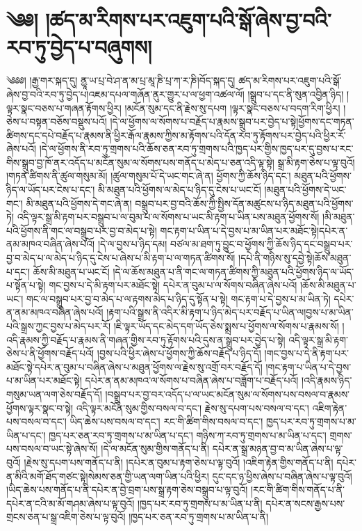 \chapter{༄༅། །ཚད་མ་རིགས་པར་འཇུག་པའི་སྒོ་ཞེས་བྱ་བའི་རབ་ཏུ་བྱེད་པ་བཞུགས།}༄༅༅། །རྒྱ་གར་སྐད་དུ། ནྱཱ་ཡ་པྲ་བེ་ཤ་ན་མ་པྲ་མཱ་ཎི་པྲ་ཀ་ར་ཎི།བོད་སྐད་དུ། ཚད་མ་རིགས་པར་འཇུག་པའི་སྒོ་ཞེས་བྱ་བའི་རབ་ཏུ་བྱེད་པ།འཇམ་དཔལ་གཞོན་ནུར་གྱུར་པ་ལ་ཕྱག་འཚལ་ལོ། །སྒྲུབ་པ་དང་ནི་སུན་འབྱིན་ཉིད། །ལྟར་སྣང་བཅས་པ་གཞན་རྟོགས་ཕྱིར། །མངོན་སུམ་དང་ནི་རྗེས་སུ་དཔག །ལྟར་སྣང་བཅས་པ་བདག་རིག་ཕྱིར། །ཅེས་པ་བསྟན་བཅོས་བསྡུས་པའོ། །དེ་ལ་ཕྱོགས་ལ་སོགས་པ་བརྗོད་པ་རྣམས་སྒྲུབ་པར་བྱེད་པ་སྟེ།ཕྱོགས་དང་གཏན་ཚིགས་དང་དཔེ་བརྗོད་པ་རྣམས་ནི་ཕྱིར་རྒོལ་རྣམས་ཀྱིས་མ་རྟོགས་པའི་དོན་རབ་ཏུ་རྟོགས་པར་བྱེད་པའི་ཕྱིར་རོ་ཞེས་པའོ། །དེ་ལ་ཕྱོགས་ནི་རབ་ཏུ་གྲགས་པའི་ཆོས་ཅན་རབ་ཏུ་གྲགས་པའི་ཁྱད་པར་གྱིས་ཁྱད་པར་དུ་བྱས་པ་རང་གིས་སྒྲུབ་བྱ་ཁོ་ནར་འདོད་པ་མངོན་སུམ་ལ་སོགས་པས་གནོད་པ་མེད་པ་ཅན་འདི་ལྟ་སྟེ། སྒྲ་མི་རྟག་ཅེས་པ་ལྟ་བུའོ། །གཏན་ཚིགས་ནི་ཚུལ་གསུམ་མོ། །ཚུལ་གསུམ་པོ་དེ་ཡང་གང་ཞེ་ན། ཕྱོགས་ཀྱི་ཆོས་ཉིད་དང་། མཐུན་པའི་ཕྱོགས་ཉིད་ལ་ཡོད་པར་ངེས་པ་དང་། མི་མཐུན་པའི་ཕྱོགས་ལ་མེད་པ་ཉིད་དུ་ངེས་པ་ཡང་ངོ། །མཐུན་པའི་ཕྱོགས་དེ་ཡང་གང་། མི་མཐུན་པའི་ཕྱོགས་དེ་གང་ཞེ་ན། བསྒྲུབ་པར་བྱ་བའི་ཆོས་ཀྱི་སྤྱིས་དོན་མཚུངས་པ་ཉིད་མཐུན་པའི་ཕྱོགས་ཏེ། འདི་ལྟར་སྒྲ་མི་རྟག་པར་བསྒྲུབ་པ་ལ་བུམ་པ་ལ་སོགས་པ་ཡང་མི་རྟག་པ་ཡིན་པས་མཐུན་ཕྱོགས་སོ། །མི་མཐུན་པའི་ཕྱོགས་ནི་གང་ལ་བསྒྲུབ་པར་བྱ་བ་མེད་པ་སྟེ། གང་རྟག་པ་ཡིན་པ་དེ་བྱས་པ་མ་ཡིན་པར་མཐོང་སྟེ།དཔེར་ན་ནམ་མཁའ་བཞིན་ཞེས་པའོ། །དེ་ལ་བྱས་པ་ཉིད་དམ། བཙལ་མ་ཐག་ཏུ་བྱུང་བ་ཕྱོགས་ཀྱི་ཆོས་ཉིད་དང་བསྒྲུབ་པར་བྱ་བ་མེད་པ་ལ་མེད་པ་ཉིད་དུ་ངེས་པ་ཞེས་པ་མི་རྟག་པ་ལ་གཏན་ཚིགས་སོ། །དཔེ་ནི་གཉིས་སུ་དབྱེ་སྟེ།ཆོས་མཐུན་པ་དང་། ཆོས་མི་མཐུན་པ་ཡང་ངོ། །དེ་ལ་ཆོས་མཐུན་པ་ནི་གང་ལ་གཏན་ཚིགས་ཀྱི་མཐུན་པའི་ཕྱོགས་ཉིད་ལ་ཡོད་པ་སྟོན་པ་སྟེ། གང་བྱས་པ་དེ་མི་རྟག་པར་མཐོང་སྟེ། དཔེར་ན་བུམ་པ་ལ་སོགས་བཞིན་ཞེས་པའོ། །ཆོས་མི་མཐུན་པ་ཡང་། གང་ལ་བསྒྲུབ་པར་བྱ་བ་མེད་པ་ལ་རྟགས་མེད་པ་ཉིད་དུ་སྟོན་པ་སྟེ། གང་རྟག་པ་དེ་བྱས་པ་མ་ཡིན་ཏེ། དཔེར་ན་ནམ་མཁའ་བཞིན་ཞེས་པའོ། །རྟག་པའི་སྒྲས་ནི་འདིར་མི་རྟག་པ་ཉིད་མེད་པར་བརྗོད་པ་ཡིན་ལ།བྱས་པ་མ་ཡིན་པའི་སྒྲས་ཀྱང་བྱས་པ་མེད་པར་རོ། །ཇི་ལྟར་ཡོད་དང་མེད་དག་ཡོད་ཅེས་སྨྲས་པ་ཕྱོགས་ལ་སོགས་པ་རྣམས་སོ། །འདི་རྣམས་ཀྱི་བརྗོད་པ་རྣམས་ནི་གཞན་གྱིས་རབ་ཏུ་རྟོགས་པའི་དུས་ན་སྒྲུབ་པར་བྱེད་པ་སྟེ། འདི་ལྟར་སྒྲ་མི་རྟག་ཅེས་པ་ནི་ཕྱོགས་བརྗོད་པའོ། །བྱས་པའི་ཕྱིར་ཞེས་པ་ཕྱོགས་ཀྱི་ཆོས་བརྗོད་པ་ཉིད་དོ། །གང་བྱས་པ་དེ་ནི་རྟག་པར་མཐོང་སྟེ་དཔེར་ན་བུམ་པ་བཞིན་ཞེས་པ་མཐུན་ཕྱོགས་ལ་རྗེས་སུ་འགྲོ་བར་བརྗོད་དོ། །གང་རྟག་པ་ཡིན་པ་དེ་བྱས་པ་མ་ཡིན་པར་མཐོང་སྟེ། དཔེར་ན་ནམ་མཁའ་ལ་སོགས་པ་བཞིན་ཞེས་པ་བཟློག་པ་བརྗོད་པའོ། །འདི་རྣམས་ཉིད་གསུམ་ཡན་ལག་ཅེས་བརྗོད་དོ། །བསྒྲུབ་པར་བྱ་བར་འདོད་པ་ལ་ཡང་མངོན་སུམ་ལ་སོགས་པས་བསལ་བ་རྣམས་ཕྱོགས་ལྟར་སྣང་བ་སྟེ། འདི་ལྟར་མངོན་སུམ་གྱིས་བསལ་བ་དང་། རྗེས་སུ་དཔག་པས་བསལ་བ་དང་། འཇིག་རྟེན་པས་བསལ་བ་དང་། ཡིད་ཆེས་པས་བསལ་བ་དང་། རང་གི་ཚིག་གིས་བསལ་བ་དང་། ཁྱད་པར་རབ་ཏུ་གྲགས་པ་མ་ཡིན་པ་དང་། ཁྱད་པར་ཅན་རབ་ཏུ་གྲགས་པ་མ་ཡིན་པ་དང་། གཉིས་ཀ་རབ་ཏུ་གྲགས་པ་མ་ཡིན་པ་དང་། གྲགས་པས་བསལ་བ་ཡང་སྟེ་ཞེས་སོ། །དེ་ལ་མངོན་སུམ་གྱིས་གནོད་པ་ནི། དཔེར་ན་སྒྲ་མཉན་བྱ་བ་མ་ཡིན་ཞེས་པ་ལྟ་བུའོ། །རྗེས་སུ་དཔག་པས་གནོད་པ་ནི། །དཔེར་ན་བུམ་པ་རྟག་ཅེས་པ་ལྟ་བུའོ། །འཇིག་རྟེན་གྱིས་གནོད་པ་ནི། དཔེར་ན་མིའི་མགོ་ཐོད་གཙང་སྟེ།སེམས་ཅན་གྱི་ཡན་ལག་ཡིན་པའི་ཕྱིར། དུང་དང་ཉ་ཕྱིས་ཞེས་པ་བཞིན་ཞེས་པ་ལྟ་བུའོ། །ཡིད་ཆེས་པས་གནོད་པ་ནི་དཔེར་ན་བྱེ་བྲག་པས་སྒྲ་རྟག་ཅེས་བསྒྲུབ་པ་ལྟ་བུའོ། །རང་གི་ཚིག་གིས་གནོད་པ་ནི་དཔེར་ན་ངའི་མ་མོ་གཤམ་ཞེས་པ་ལྟ་བུའོ། །ཁྱད་པར་རབ་ཏུ་གྲགས་པ་མ་ཡིན་པ་ནི། དཔེར་ན་སངས་རྒྱས་པས་གྲངས་ཅན་པ་སྒྲ་འཇིག་ཅེས་པ་ལྟ་བུའོ། །ཁྱད་པར་ཅན་རབ་ཏུ་གྲགས་པ་མ་ཡིན་པ་ནི། 